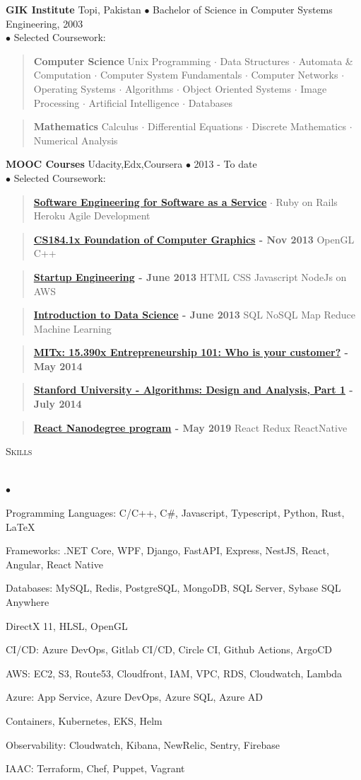\documentclass{article}
\newcommand{\area}[2]{\vspace*{-9pt} \begin{verse}\textbf{#1}   #2 \end{verse}  }
\newcommand{\lineunder}{\vspace*{-8pt} \\ \hspace*{-18pt} \hrulefill \\}
\newcommand{\header}[1]{{\hspace*{-15pt}\vspace*{6pt} \textsc{#1}} \vspace*{-6pt} \lineunder}
\newenvironment{achievements}{\begin{list}{$\bullet$}{\topsep 0pt \itemsep -2pt}}{\vspace*{4pt}\end{list}}
\newcommand{\schoolwithcourses}[4]{
 \textbf{#1} #2 $\bullet$ #3\\ 
#4 $\bullet$  Selected Coursework:\\
\vspace*{5pt}
}
\begin{document}
\schoolwithcourses{GIK Institute}{Topi, Pakistan}{Bachelor of Science in Computer Systems Engineering, 2003}
{}
	\area{Computer Science}{ Unix Programming $\cdot$ Data Structures $\cdot$ Automata \& Computation $\cdot$ Computer System Fundamentals $\cdot$ Computer Networks $\cdot$ Operating Systems $\cdot$
 Algorithms $\cdot$ Object Oriented Systems $\cdot$ Image Processing $\cdot$
Artificial Intelligence $\cdot$ Databases}
	\area{Mathematics}{Calculus $\cdot$ Differential Equations $\cdot$ Discrete Mathematics $\cdot$ Numerical Analysis}
\schoolwithcourses{MOOC Courses}{Udacity,Edx,Coursera}{2013 - To date}
{}
	\area{\href{https://www.class-central.com/mooc/305/coursera-software-as-a-service}{Software Engineering for Software as a Service}}{ $\cdot$ Ruby on Rails Heroku Agile Development}
	\area{\href{https://www.edx.org/course/uc-berkeleyx/uc-berkeleyx-cs-184-1x-foundations-1003}{CS184.1x Foundation of Computer Graphics} - Nov 2013}{ OpenGL C++}
	\area{\href{https://www.coursera.org/course/startup}{Startup Engineering} - June 2013}{ HTML CSS Javascript NodeJs on AWS}
	\area{\href{https://www.coursera.org/course/datasci}{Introduction to Data Science} - June 2013}{SQL NoSQL Map Reduce Machine Learning}
	\area{\href{https://class.coursera.org/hetero-002}{MITx: 15.390x Entrepreneurship 101: Who is your customer?} - May 2014}{}
	\area{\href{https://www.class-central.com/course/coursera-algorithms-design-and-analysis-part-1-374}{Stanford University - Algorithms: Design and Analysis, Part 1} - July 2014}{}
	\area{\href{https://www.udacity.com/course/react-nanodegree--nd019}{React Nanodegree program} - May 2019}{ React Redux ReactNative}

\header{Skills}
\begin{achievements}
\item Programming Languages: C/C++, C\#, Javascript, Typescript, Python, Rust, \LaTeX
\item Frameworks: .NET Core, WPF, Django, FastAPI, Express, NestJS, React, Angular, React Native
\item Databases: MySQL, Redis, PostgreSQL, MongoDB, SQL Server, Sybase SQL Anywhere
\item DirectX 11, HLSL, OpenGL 
\item CI/CD: Azure DevOps, Gitlab CI/CD, Circle CI, Github Actions, ArgoCD
\item AWS: EC2, S3, Route53, Cloudfront, IAM, VPC, RDS, Cloudwatch, Lambda
\item Azure: App Service, Azure DevOps, Azure SQL, Azure AD
\item Containers, Kubernetes, EKS, Helm
\item Observability: Cloudwatch, Kibana, NewRelic, Sentry, Firebase
\item IAAC: Terraform, Chef, Puppet, Vagrant
\end{achievements}
\end{document}
